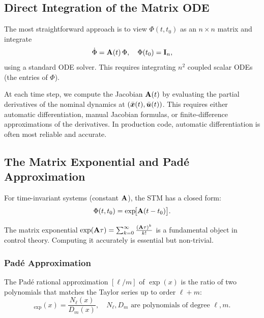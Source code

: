 \subsection{Direct Integration of the Matrix ODE}

The most straightforward approach is to view $\Phi(t,t_0)$ as an $n\times n$ matrix and integrate
\begin{equation}
\dot{\Phi} = \mathbf{A}(t)\,\Phi, \quad \Phi(t_0) = \mathbf{I}_n,
\label{eq:ch2:stm-direct}
\end{equation}
using a standard ODE solver. This requires integrating $n^2$ coupled scalar ODEs (the entries of $\Phi$).

\begin{designbox}
At each time step, we compute the Jacobian $\mathbf{A}(t)$ by evaluating the partial derivatives of the
nominal dynamics at $(\bar{\bm{x}}(t),\bar{\bm{u}}(t))$. This requires either automatic differentiation, manual
Jacobian formulas, or finite-difference approximations of the derivatives. In production code, automatic
differentiation is often most reliable and accurate.
\end{designbox}

\subsection{The Matrix Exponential and Padé Approximation}

For time-invariant systems (constant $\mathbf{A}$), the STM has a closed form:
\begin{equation}
\Phi(t,t_0) = \exp\!\bigl[\mathbf{A}(t-t_0)\bigr].
\label{eq:ch2:stm-exponential}
\end{equation}

The matrix exponential $\exp(\mathbf{A}\tau) = \sum_{k=0}^{\infty}\frac{(\mathbf{A}\tau)^k}{k!}$ is a fundamental
object in control theory. Computing it accurately is essential but non-trivial.

\subsubsection{Padé Approximation}

The Padé rational approximation $[\ell/m]$ of $\exp(x)$ is the ratio of two polynomials that matches
the Taylor series up to order $\ell+m$:
\begin{equation}
[\ell/m]_{\exp}(x) = \frac{N_\ell(x)}{D_m(x)}, \quad N_\ell, D_m \text{ are polynomials of degree } \ell, m.
\label{eq:ch2:pade}
\end{equation}

